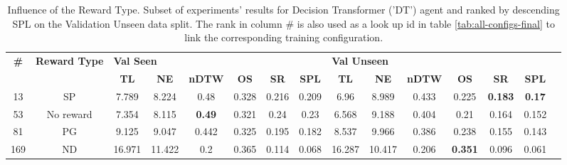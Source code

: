 \begin{table}
\centering
\caption{\label{tab:dt_reward_type}Influence of the Reward Type. Subset of experiments' results for Decision Transformer ('DT') agent and ranked by descending SPL on the Validation Unseen data split. The rank in column \# is also used as a look up id in table \ref{tab:all-configs-final} to link the corresponding training configuration.}
\begin{tabular}{@{\hskip3pt}c@{\hskip3pt}c@{\hskip3pt}c@{\hskip3pt}c@{\hskip3pt}c@{\hskip3pt}c@{\hskip3pt}c@{\hskip3pt}c@{\hskip3pt}c@{\hskip3pt}c@{\hskip3pt}c@{\hskip3pt}c@{\hskip3pt}c@{\hskip3pt}c@{\hskip3pt}c}
\toprule
\textbf{\#} & \textbf{Reward Type} & \multicolumn{6}{l}{\textbf{Val Seen}} & \multicolumn{6}{l}{\textbf{Val Unseen}} \\
 \textbf{~} &           \textbf{~} &       \textbf{TL} & \textbf{NE} &  \textbf{nDTW} & \textbf{OS} & \textbf{SR} & \textbf{SPL} &         \textbf{TL} & \textbf{NE} & \textbf{nDTW} &     \textbf{OS} &     \textbf{SR} &   \textbf{SPL} \\
\midrule
         13 &                   SP &             7.789 &       8.224 &           0.48 &       0.328 &       0.216 &        0.209 &                6.96 &       8.989 &         0.433 &           0.225 &  \textbf{0.183} &  \textbf{0.17} \\
         53 &            No reward &             7.354 &       8.115 &  \textbf{0.49} &       0.321 &        0.24 &         0.23 &               6.568 &       9.188 &         0.404 &            0.21 &           0.164 &          0.152 \\
         81 &                   PG &             9.125 &       9.047 &          0.442 &       0.325 &       0.195 &        0.182 &               8.537 &       9.966 &         0.386 &           0.238 &           0.155 &          0.143 \\
        169 &                   ND &            16.971 &      11.422 &            0.2 &       0.365 &       0.114 &        0.068 &              16.287 &      10.417 &         0.206 &  \textbf{0.351} &           0.096 &          0.061 \\
\bottomrule
\end{tabular}
\end{table}
